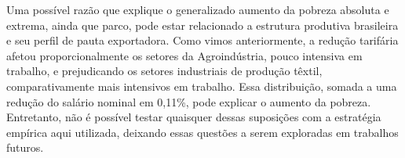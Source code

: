 Uma possível razão que explique o generalizado aumento da pobreza absoluta e extrema, ainda que parco, pode estar relacionado a estrutura produtiva brasileira e seu perfil de pauta exportadora. Como vimos anteriormente, a redução tarifária afetou proporcionalmente os setores da Agroindústria, pouco intensiva em trabalho, e prejudicando os setores industriais de produção têxtil, comparativamente mais intensivos em trabalho. Essa distribuição, somada a uma redução do salário nominal em 0,11\%, pode explicar o aumento da pobreza. Entretanto, não é possível testar quaisquer dessas suposições com a estratégia empírica aqui utilizada, deixando essas questões a serem exploradas em trabalhos futuros.


